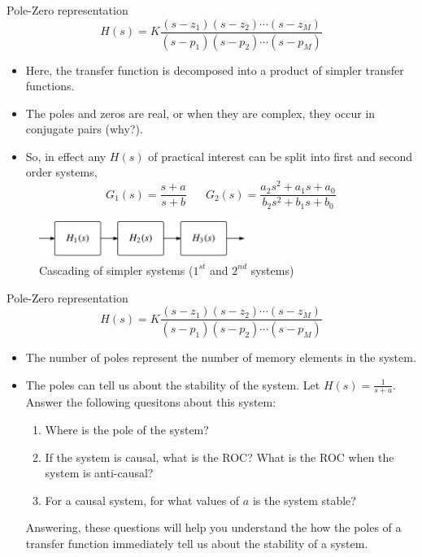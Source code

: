 \documentclass{beamer}
\begin{document}
\begin{frame}{Pole-Zero representation}
\[ H(s) = K\frac{\left(s-z_1\right)\left(s-z_2\right)\cdots\left(s-z_M\right)}{\left(s-p_1\right)\left(s-p_2\right)\cdots\left(s-p_M\right)} \]

\begin{itemize}
\item Here, the transfer function is decomposed into a product of simpler transfer functions.
\item The poles and zeros are real, or when they are complex, they occur in conjugate pairs (why?).
\item So, in effect any $H(s)$ of practical interest can be split into first and second order systems,
\[ G_1(s) = \frac{s + a}{s + b} \,\,\,\,\,\,\,\,\,\, G_2(s) = \frac{a_2s^2+a_1s+a_0}{b_2s^2+b_1s+b_0} \]
\end{itemize}
\begin{figure}
\centering
\caption{\tiny{Cascading of simpler systems ($1^{st}$ and $2^{nd}$ systems)}}
\includegraphics[width=0.6\textwidth]{img/series.png}
\end{figure}

\end{frame}

\begin{frame}{Pole-Zero representation}
\[ H(s) = K\frac{\left(s-z_1\right)\left(s-z_2\right)\cdots\left(s-z_M\right)}{\left(s-p_1\right)\left(s-p_2\right)\cdots\left(s-p_M\right)} \]

\begin{itemize}
\item The number of poles represent the number of memory elements in the system.
\item The poles can tell us about the stability of the system. Let $H(s) = \frac{1}{s+a}$. Answer the following quesitons about this system:
\begin{enumerate}
\item Where is the pole of the system?
\item If the system is causal, what is the ROC? What is the ROC when the system is anti-causal?
\item For a causal system, for what values of $a$ is the system stable?
\end{enumerate} 

Answering, these questions will help you understand the how the poles of a transfer function immediately tell us about the stability of a system. 
\end{itemize}
\end{frame}
\end{document}

